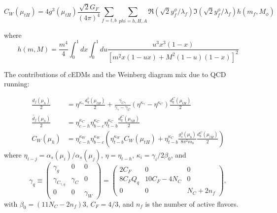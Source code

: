 \begin{adjustwidth}{-2cm}{-1.5cm}
	\begin{equation}
		C_W\left(\mu_{t H}\right)=4 g^3\left(\mu_{t H}\right) \frac{\sqrt{2} G_F}{(4 \pi)^4} \sum_{f=t, b} \sum_{phi=h, H, A} \Re\left(\sqrt{2}y_f^{\phi}/\lambda_{f}\right) \Im\left(\sqrt{2}y_f^{\phi}/\lambda_{f}\right) h\left(m_f, M_{\phi}\right) 
	\end{equation}
\end{adjustwidth}
where
\begin{equation}
	h(m, M)=\frac{m^4}{4} \int_0^1 d x \int_0^1 d u \frac{u^3 x^3(1-x)}{\left[m^2 x(1-u x)+M^2(1-u)(1-x)\right]^2}
\end{equation}

The contributions of cEDMs and the Weinberg diagram mix due to QCD running:

\begin{align}
	\frac{d_{f}(\mu_{h})}{2} &= \eta^{\kappa_\gamma} \frac{d_q^\gamma\left(\mu_{t H}\right)}{2}+\frac{\gamma_{C \gamma}}{\gamma_\gamma-\gamma_C}\left(\eta^{\kappa_\gamma}-\eta^{\kappa_C}\right) \frac{d_q^C\left(\mu_{t H}\right)}{2} \\
	\frac{\tilde{d_{f}}(\mu_{h})}{2} &= \eta_{c-h}^{\kappa_C} \eta_{b-c}^{\kappa_C} \eta_{t-b}^{\kappa_C} \frac{d_q^C\left(\mu_{t H}\right)}{2} \\
	C_{W}(\mu_{h}) &= \eta_{c-h}^{\kappa_W} \eta_{b-c}^{\kappa_W}\left(\eta_{t-b}^{\kappa_W} C_W\left(\mu_{t H}\right)+\eta_{t-b}^{\kappa_C} \frac{g_s^3\left(\mu_b\right)}{8 \pi^2 m_b} \frac{d_b^C\left(\mu_{t H}\right)}{2}\right)
\end{align}
where \(\eta_{i-j} = \alpha_{s}(\mu_{i})/\alpha_{s}(\mu_{j}) \), \(\eta = \eta_{t-h} \),
\(\kappa_{i} = \gamma_{i}/2\beta_{0} \), and
\begin{equation*}
	\gamma_{q} \equiv 
	\begin{pmatrix}
		\gamma_{g} & 0 & 0 \\
		\gamma_{C_{\gamma,q}} & \gamma_{C} & 0 \\
		0 & 0 & \gamma_{W}
	\end{pmatrix}
	= 
	\begin{pmatrix}
		2C_{F} & 0 & 0 \\
		8C_{F}Q_{q} & 10C_{F}-4N_{C} & 0 \\
		0 & 0 & N_{C}+2n_{f}
	\end{pmatrix},
\end{equation*}
with \(\beta_{0} = (11N_{C}-2n_{f})3 \), \(C_{F} = 4/3 \), and \(n_{f} \) is the number of active flavors.

\clearpage
